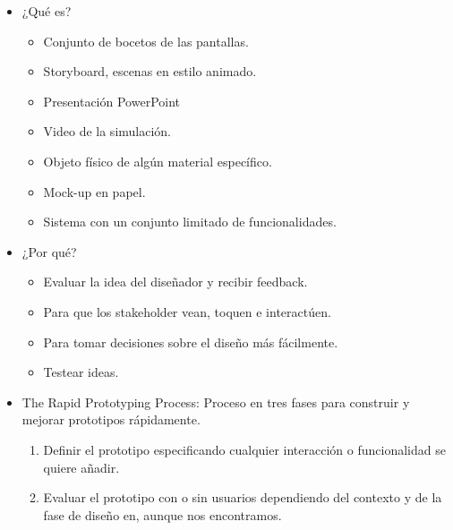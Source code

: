 \documentclass[12pt, twoside, openright]{report} %
\begin{document}
\begin{itemize}
	\item ¿Qué es?

	      \begin{itemize}
		      \item Conjunto de bocetos de las pantallas.

		      \item Storyboard, escenas en estilo animado.

		      \item Presentación PowerPoint

		      \item Video de la simulación.

		      \item Objeto físico de algún material específico.

		      \item Mock-up en papel.

		      \item Sistema con un conjunto limitado de funcionalidades.
	      \end{itemize}
	\item ¿Por qué?

	      \begin{itemize}
		      \item Evaluar la idea del diseñador y recibir feedback.

		      \item Para que los stakeholder vean, toquen e interactúen.

		      \item Para tomar decisiones sobre el diseño más fácilmente.

		      \item Testear ideas.
	      \end{itemize}
	\item The Rapid Prototyping Process: Proceso en tres fases para
	      construir y mejorar prototipos rápidamente.

	      \begin{enumerate}
		      \def\labelenumi{\arabic{enumi}.}


		      \item Definir el prototipo especificando cualquier interacción o
		            funcionalidad se quiere añadir.

		      \item Evaluar el prototipo con o sin usuarios dependiendo del contexto
		            y de la fase de diseño en, aunque nos encontramos.


\end{enumerate}
\end{itemize}
\end{document}
